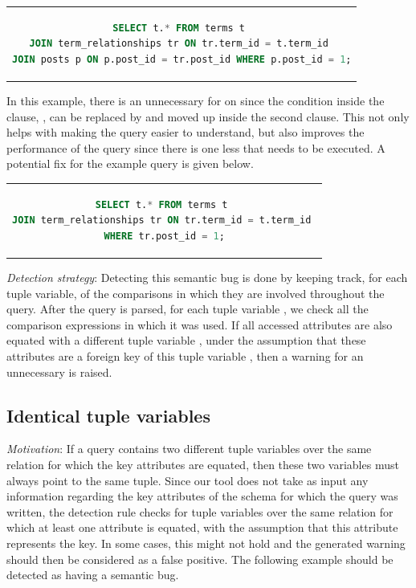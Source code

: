 \begin{center}
\begin{tabular}{c}
\begin{lstlisting}[language=SQL]
SELECT t.* FROM terms t 
JOIN term_relationships tr ON tr.term_id = t.term_id 
JOIN posts p ON p.post_id = tr.post_id WHERE p.post_id = 1;
\end{lstlisting}
\end{tabular}
\end{center}

In this example, there is an unnecessary  for  on  since the condition inside the  clause, , can be replaced by  and moved up inside the second  clause. This not only helps with making the query easier to understand, but also improves the performance of the query since there is one less  that needs to be executed. A potential fix for the example query is given below.

\begin{center}
\begin{tabular}{c}
\begin{lstlisting}[language=SQL]
SELECT t.* FROM terms t 
JOIN term_relationships tr ON tr.term_id = t.term_id 
WHERE tr.post_id = 1;
\end{lstlisting}
\end{tabular}
\end{center}

\noindent \emph{Detection strategy}: Detecting this semantic bug is done by keeping track, for each tuple variable, of the comparisons in which they are involved throughout the query. After the query is parsed, for each tuple variable , we check all the comparison expressions in which it was used. If all accessed attributes are also equated with a different tuple variable , under the assumption that these attributes are a foreign key of this tuple variable , then a warning for an unnecessary  is raised.

\subsection{Identical tuple variables}
\emph{Motivation}: If a query contains two different tuple variables over the same relation for which the key attributes are equated, then these two variables must always point to the same tuple. Since our tool does not take as input any information regarding the key attributes of the schema for which the query was written, the detection rule checks for tuple variables over the same relation for which at least one attribute is equated, with the assumption that this attribute represents the key. In some cases, this might not hold and the generated warning should then be considered as a false positive. The following example should be detected as having a semantic bug.

